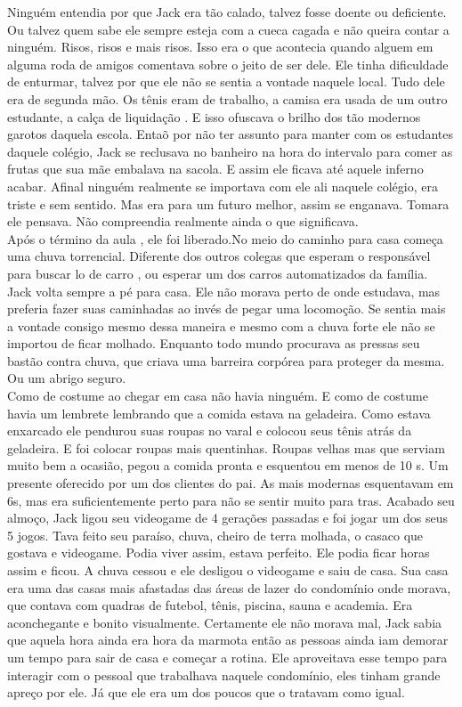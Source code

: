 \documentclass{book}
\begin{document}
 Ninguém entendia por que Jack era tão calado, talvez fosse doente ou deficiente. Ou talvez quem sabe ele sempre esteja com a cueca cagada e não queira contar a ninguém. Risos, risos e mais risos. Isso era o que acontecia quando alguem em alguma roda de amigos comentava sobre o jeito de ser dele. Ele tinha dificuldade de enturmar, talvez por que ele não se sentia a vontade naquele local. Tudo dele era de segunda mão. Os tênis eram de trabalho, a camisa era usada de um outro estudante, a calça de liquidação . E isso ofuscava o brilho dos tão modernos garotos daquela escola. Entaõ por não ter assunto para manter com os estudantes daquele colégio, Jack se reclusava no banheiro na hora do intervalo para comer as frutas que sua mãe embalava na sacola. E assim ele ficava até aquele inferno acabar. Afinal ninguém realmente se importava com ele ali naquele colégio, era triste e sem sentido. Mas era para um futuro melhor, assim se enganava. Tomara ele pensava. Não compreendia realmente ainda o que significava.\\
 
 Após o término da aula , ele foi liberado.No meio do caminho para casa começa uma chuva torrencial. Diferente dos outros colegas que esperam o responsável para buscar lo de carro , ou esperar um dos carros automatizados da família. Jack volta sempre a pé para casa. Ele não morava perto de onde estudava, mas preferia fazer suas caminhadas ao invés de pegar uma locomoção. Se sentia mais a vontade consigo mesmo dessa maneira e mesmo com a chuva forte ele não se importou de ficar molhado. Enquanto todo mundo procurava as pressas seu bastão contra chuva, que criava uma barreira corpórea para proteger da mesma. Ou um abrigo seguro. \\
 
 Como de costume ao chegar em casa não havia ninguém. E como de costume havia um lembrete lembrando que a comida estava na geladeira. Como estava enxarcado ele pendurou suas roupas no varal e colocou seus tênis atrás da geladeira. E foi colocar roupas mais quentinhas. Roupas velhas mas que serviam muito bem a ocasião, pegou a comida pronta e esquentou em menos de 10 s. Um presente oferecido por um dos clientes do pai. As mais modernas esquentavam em 6s, mas era suficientemente perto para não se sentir muito para tras. Acabado seu almoço, Jack ligou seu videogame de 4 gerações passadas e foi jogar um dos seus 5 jogos. Tava feito seu paraíso, chuva, cheiro de terra molhada, o casaco que gostava e videogame. Podia viver assim, estava perfeito. Ele podia ficar horas assim e ficou. A chuva cessou e ele desligou o videogame e saiu de casa. Sua casa era uma das casas mais afastadas das áreas de lazer do condomínio onde morava, que contava com quadras de futebol, tênis, piscina, sauna e academia. Era aconchegante e bonito visualmente. Certamente ele não morava mal, Jack sabia que aquela hora ainda era hora da marmota então as pessoas ainda iam demorar um tempo para sair de casa e começar a rotina. Ele aproveitava esse tempo para interagir com o pessoal que trabalhava naquele condomínio, eles tinham grande apreço por ele. Já que ele era um dos poucos que o tratavam como igual. \\
 
\end{document}
